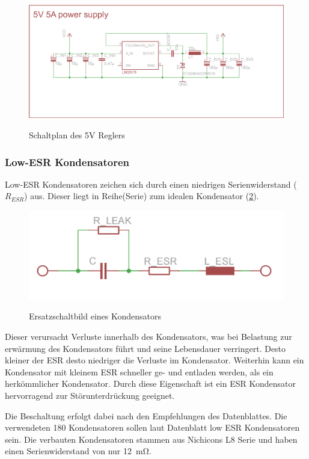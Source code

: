 \begin{figure}[H]
\centering
\includegraphics[width=.8\textwidth]{5vregler.png}\\
\caption{Schaltplan des 5V Reglers}%
\label{fig:vreg}
\end{figure}

\subsubsection{Low-ESR Kondensatoren}

Low-ESR Kondensatoren zeichen sich durch einen niedrigen Serienwiderstand ($R_{ESR}$) aus.
Dieser liegt in Reihe(Serie) zum idealen Kondensator (\cref{fig:esr}). 

\begin{figure}[H]
\centering
\includegraphics[width=.5\textwidth]{esr.png}\\
\caption{Ersatzschaltbild eines Kondensators}%
\label{fig:esr}
\end{figure}

Dieser verursacht Verluste innerhalb des Kondensators, was bei Belastung zur erwärmung des Kondensators führt und
seine Lebensdauer verringert. Desto kleiner der ESR desto niedriger die Verluste im Kondensator. Weiterhin
kann ein Kondensator mit kleinem ESR schneller ge- und entladen werden, als ein herkömmlicher Kondensator.
Durch diese Eigenschaft ist ein ESR Kondensator hervorragend zur Störunterdrückung geeignet.


Die Beschaltung erfolgt dabei nach den Empfehlungen des Datenblattes. Die verwendeten \SI{180}{\uF} Kondensatoren sollen laut Datenblatt low ESR Kondensatoren sein. Die verbauten Kondensatoren stammen aus Nichicons L8 Serie und haben einen Serienwiderstand von nur \SI{12}{\mohm}.

